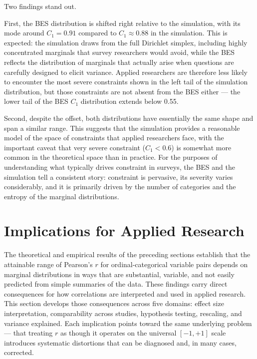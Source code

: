 \documentclass[
  12pt,
]{article}
\theoremstyle{plain}
\theoremstyle{definition}
\theoremstyle{remark}
\begin{document}
Two findings stand out.

First, the BES distribution is shifted right relative to the simulation,
with its mode around \(C_1 = 0.91\) compared to \(C_1 \approx 0.88\) in
the simulation. This is expected: the simulation draws from the full
Dirichlet simplex, including highly concentrated marginals that survey
researchers would avoid, while the BES reflects the distribution of
marginals that actually arise when questions are carefully designed to
elicit variance. Applied researchers are therefore less likely to
encounter the most severe constraints shown in the left tail of the
simulation distribution, but those constraints are not absent from the
BES either --- the lower tail of the BES \(C_1\) distribution extends
below 0.55.

Second, despite the offset, both distributions have essentially the same
shape and span a similar range. This suggests that the simulation
provides a reasonable model of the space of constraints that applied
researchers face, with the important caveat that very severe constraint
(\(C_1 < 0.6\)) is somewhat more common in the theoretical space than in
practice. For the purposes of understanding what typically drives
constraint in surveys, the BES and the simulation tell a consistent
story: constraint is pervasive, its severity varies considerably, and it
is primarily driven by the number of categories and the entropy of the
marginal distributions.

\section{Implications for Applied Research}\label{sec-implications}

The theoretical and empirical results of the preceding sections
establish that the attainable range of Pearson's \(r\) for
ordinal-categorical variable pairs depends on marginal distributions in
ways that are substantial, variable, and not easily predicted from
simple summaries of the data. These findings carry direct consequences
for how correlations are interpreted and used in applied research. This
section develops those consequences across five domains: effect size
interpretation, comparability across studies, hypothesis testing,
rescaling, and variance explained. Each implication points toward the
same underlying problem --- that treating \(r\) as though it operates on
the universal \([-1, +1]\) scale introduces systematic distortions that
can be diagnosed and, in many cases, corrected.
\end{document}
